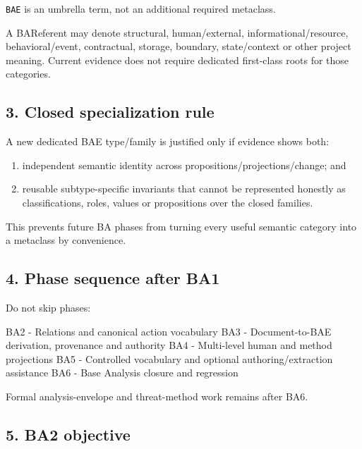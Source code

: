 \documentclass[
  10pt,
  a4paper,
]{article}
\newenvironment{Shaded}{}{}
\newcommand{\NormalTok}[1]{#1}
\providecommand{\tightlist}{%
  \setlength{\itemsep}{0pt}\setlength{\parskip}{0pt}}
\begin{document}
\texttt{BAE} is an umbrella term, not an additional required metaclass.

A BAReferent may denote structural, human/external,
informational/resource, behavioral/event, contractual, storage,
boundary, state/context or other project meaning. Current evidence does
not require dedicated first-class roots for those categories.

\subsection{3. Closed specialization
rule}\label{closed-specialization-rule}

A new dedicated BAE type/family is justified only if evidence shows
both:

\begin{enumerate}
\def\labelenumi{\arabic{enumi}.}
\tightlist
\item
  independent semantic identity across propositions/projections/change;
  and
\item
  reusable subtype-specific invariants that cannot be represented
  honestly as classifications, roles, values or propositions over the
  closed families.
\end{enumerate}

This prevents future BA phases from turning every useful semantic
category into a metaclass by convenience.

\subsection{4. Phase sequence after BA1}\label{phase-sequence-after-ba1}

Do not skip phases:

\begin{Shaded}
\begin{Highlighting}[]
\NormalTok{BA2 {-} Relations and canonical action vocabulary}
\NormalTok{BA3 {-} Document{-}to{-}BAE derivation, provenance and authority}
\NormalTok{BA4 {-} Multi{-}level human and method projections}
\NormalTok{BA5 {-} Controlled vocabulary and optional authoring/extraction assistance}
\NormalTok{BA6 {-} Base Analysis closure and regression}
\end{Highlighting}
\end{Shaded}

Formal analysis-envelope and threat-method work remains after BA6.

\subsection{5. BA2 objective}\label{ba2-objective}
\end{document}
